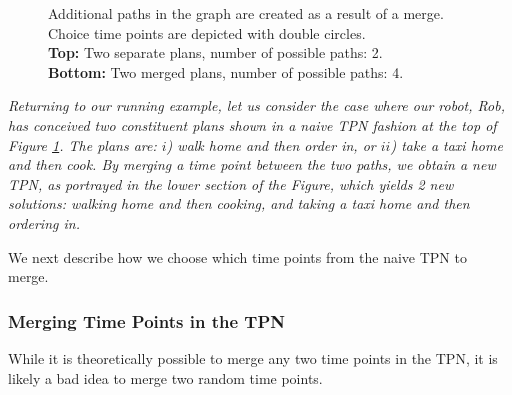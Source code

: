 \begin{figure}
\begin{minipage}[t]{0.5\textwidth}
    \end{minipage}
    \caption{Additional paths in the graph are created as a result of a merge. Choice time points are depicted with double circles.\\
    \textbf{Top:} Two separate plans, number of possible paths: 2. \\
    \textbf{Bottom:} Two merged plans, number of possible paths: 4.}
    \label{fig:add_plans_from_merge}
    \vspace{-4mm}
\end{figure}


\begin{tcolorbox}[colback=red!5!white,colframe=red!75!black]
  \textit{Returning to our running example, let us consider the case where our robot, Rob, has conceived two constituent plans
   shown in a \textit{naive} TPN fashion at the top of Figure \ref{fig:add_plans_from_merge}.
   The plans are: $i$) walk home and then order in, or $ii$) take a taxi home and then cook.
   By merging a time point between the two paths, we obtain a new TPN, as portrayed in the lower section of the Figure, which yields 2 
   new solutions: walking home and then cooking, and taking a taxi home and then ordering in.
  }
\end{tcolorbox}


We next describe how we choose which time points from the naive TPN to merge.


\subsubsection{Merging Time Points in the TPN} 
While it is theoretically possible to merge any two time points in the TPN, it is likely a bad idea to merge two random time points. 

